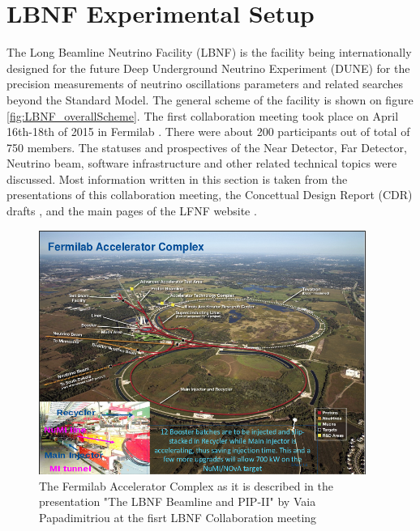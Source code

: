 
\section{LBNF Experimental Setup}

The Long Beamline Neutrino Facility (LBNF) is the facility being internationally designed for the future Deep Underground Neutrino Experiment (DUNE) for the precision measurements of neutrino oscillations parameters and related searches beyond the Standard Model. The general scheme of the facility is shown on figure \ref{fig:LBNF_overallScheme}. The first collaboration meeting took place on April 16th-18th of 2015 in Fermilab \cite{ref_LBNF_collaborationMeeting}. There were about 200 participants out of total of 750 members. The statuses and prospectives of the Near Detector, Far Detector, Neutrino beam, software infrastructure and other related technical topics were discussed. Most information written in this section is taken from the presentations of this collaboration meeting, the Concettual Design Report (CDR) drafts \cite{ref_LBNFdoc_volume-detectors}, \cite{ref_LBNFdoc_volume-physics} and the main pages of the LFNF website \cite{ref_LBNFweb}.

\begin{figure}
\caption{The Fermilab Accelerator Complex as it is described in the presentation "The LBNF Beamline and PIP-II" by Vaia Papadimitriou at the fisrt LBNF Collaboration meeting \cite{ref_LBNF_collaborationMeeting}}
\label{fig:LBNF_FermilabAccComplex}
\centering
\includegraphics[width=0.95\textwidth, keepaspectratio=true]{figs/FermilabAccelerator.png}

\end{figure}

